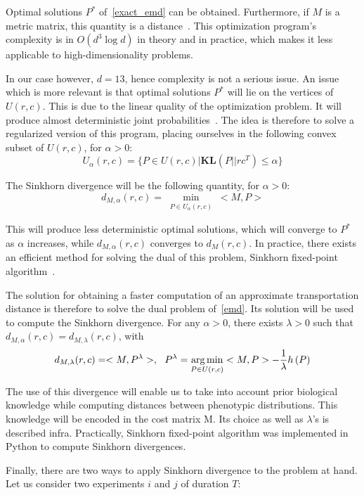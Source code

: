 Optimal solutions $P^*$ of~\ref{exact_emd} can be obtained. Furthermore, if $M$ is a metric matrix, this quantity is a distance~\cite{Villani}. This optimization program's complexity is in $O\left( d^3\log d\right) $ in theory and in practice, which makes it less applicable to high-dimensionality problems. 

In our case however, $d=13$, hence complexity is not a serious issue. An issue which is more relevant is that optimal solutions $P^*$ will lie on the vertices of $U(r,c)$. This is due to the linear quality of the optimization problem. It will produce almost deterministic joint probabilities~\cite{sinkhorn}. The idea is therefore to solve a regularized version of this program, placing ourselves in the following convex subset of $U(r,c)$, for $\alpha >0$:
\[
U_\alpha\left( r, c\right) = \{ P \in U\left( r,c \right) | \mathbf{KL}\left(P || rc^T\right)\leqslant \alpha\}
\]

The Sinkhorn divergence will be the following quantity, for $\alpha >0$:
\begin{equation}
d_{M, \alpha}(r,c) = \min_{\substack{P\in U_\alpha (r,c)}} <M,P>
\label{emd}
\end{equation}

This will produce less deterministic optimal solutions, which will converge to $P^*$ as $\alpha$ increases, while $d_{M, \alpha}(r,c)$ converges to $d_{M}(r,c)$. In practice, there exists an efficient method for solving the dual of this problem, Sinkhorn fixed-point algorithm~\cite{sinkhorn_original}. 

The solution for obtaining a faster computation of an approximate transportation distance is therefore to solve the dual problem of~\ref{emd}. Its solution will be used to compute the Sinkhorn divergence. For any $\alpha >0$, there exists $\lambda >0$ such that $d_{M, \alpha}(r,c) = d_{M, \lambda}(r,c)$, with
\[
d_{M, \lambda}(r,c) = <M,P^\lambda>,~~ P^\lambda = \operatorname*{arg\,min}_{\substack{P\in U (r,c)}} <M,P> - \dfrac{1}{\lambda} h\left( P\right)
\]

The use of this divergence will enable us to take into account prior biological knowledge while computing distances between phenotypic distributions. This knowledge will be encoded in the cost matrix M. Its choice as well as $\lambda$'s is described infra. Practically, Sinkhorn fixed-point algorithm was implemented in Python to compute Sinkhorn divergences.

Finally, there are two ways to apply Sinkhorn divergence to the problem at hand. Let us consider two experiments $i$ and $j$ of duration $T$: 

